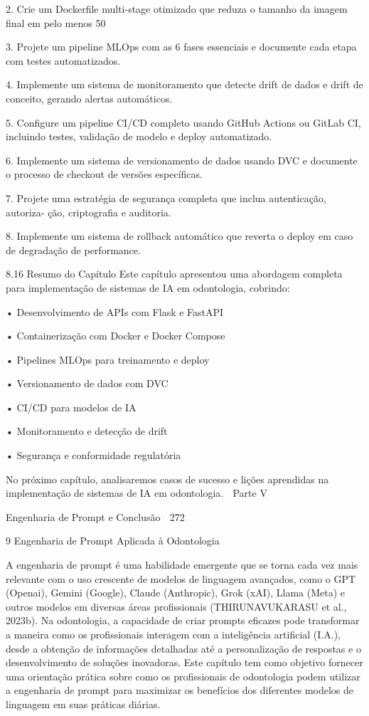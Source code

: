   2. Crie um Dockerfile multi-stage otimizado que reduza o tamanho da imagem final
     em pelo menos 50%

  3. Projete um pipeline MLOps com as 6 fases essenciais e documente cada etapa
     com testes automatizados.

  4. Implemente um sistema de monitoramento que detecte drift de dados e drift de
     conceito, gerando alertas automáticos.

  5. Configure um pipeline CI/CD completo usando GitHub Actions ou GitLab CI,
     incluindo testes, validação de modelo e deploy automatizado.

  6. Implemente um sistema de versionamento de dados usando DVC e documente o
     processo de checkout de versões específicas.

  7. Projete uma estratégia de segurança completa que inclua autenticação, autoriza-
     ção, criptografia e auditoria.

  8. Implemente um sistema de rollback automático que reverta o deploy em caso de
     degradação de performance.


8.16      Resumo do Capítulo
Este capítulo apresentou uma abordagem completa para implementação de sistemas
de IA em odontologia, cobrindo:

    • Desenvolvimento de APIs com Flask e FastAPI

    • Containerização com Docker e Docker Compose

    • Pipelines MLOps para treinamento e deploy

    • Versionamento de dados com DVC

    • CI/CD para modelos de IA

    • Monitoramento e detecção de drift

    • Segurança e conformidade regulatória

       No próximo capítulo, analisaremos casos de sucesso e lições aprendidas na
implementação de sistemas de IA em odontologia.
            Parte V

Engenharia de Prompt e Conclusão
                                                                                 272



9 Engenharia de Prompt Aplicada à
  Odontologia

A engenharia de prompt é uma habilidade emergente que se torna cada vez mais
relevante com o uso crescente de modelos de linguagem avançados, como o GPT
(Openai), Gemini (Google), Claude (Anthropic), Grok (xAI), Llama (Meta) e outros
modelos em diversas áreas profissionais (THIRUNAVUKARASU et al., 2023b). Na
odontologia, a capacidade de criar prompts eficazes pode transformar a maneira como
os profissionais interagem com a inteligência artificial (I.A.), desde a obtenção de
informações detalhadas até a personalização de respostas e o desenvolvimento de
soluções inovadoras.
         Este capítulo tem como objetivo fornecer uma orientação prática sobre como
os profissionais de odontologia podem utilizar a engenharia de prompt para maximizar
os benefícios dos diferentes modelos de linguagem em suas práticas diárias.



